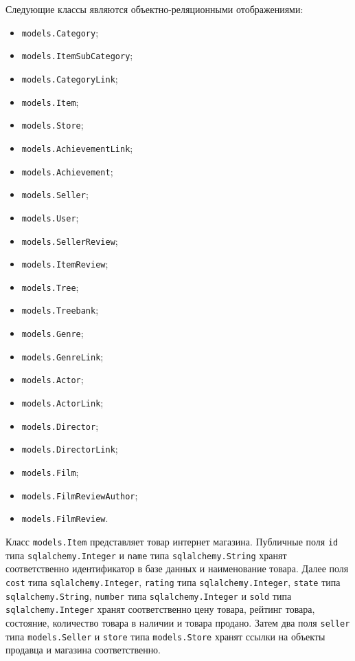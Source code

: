 Следующие классы являются объектно-реляционными отображениями:
\begin{itemize}
\item \texttt{models.Category};
\item \texttt{models.ItemSubCategory};
\item \texttt{models.CategoryLink};
\item \texttt{models.Item};
\item \texttt{models.Store};
\item \texttt{models.AchievementLink};
\item \texttt{models.Achievement};
\item \texttt{models.Seller};
\item \texttt{models.User};
\item \texttt{models.SellerReview};
\item \texttt{models.ItemReview};
\item \texttt{models.Tree};
\item \texttt{models.Treebank};
\item \texttt{models.Genre};
\item \texttt{models.GenreLink};
\item \texttt{models.Actor};
\item \texttt{models.ActorLink};
\item \texttt{models.Director};
\item \texttt{models.DirectorLink};
\item \texttt{models.Film};
\item \texttt{models.FilmReviewAuthor};
\item \texttt{models.FilmReview}.
\end{itemize}

Класс \texttt{models.Item} представляет товар интернет магазина. Публичные поля \texttt{id} типа \texttt{sqlalchemy.Integer} и \texttt{name} типа \texttt{sqlalchemy.String} хранят соответственно идентификатор в базе данных и наименование товара. Далее поля \texttt{cost} типа \texttt{sqlalchemy.Integer}, \texttt{rating} типа \texttt{sqlalchemy.Integer}, \texttt{state} типа \texttt{sqlalchemy.String}, \texttt{number} типа \texttt{sqlalchemy.Integer} и \texttt{sold} типа \texttt{sqlalchemy.Integer} хранят соответственно цену товара, рейтинг товара, состояние, количество товара в наличии и товара продано. Затем два поля \texttt{seller} типа \texttt{models.Seller} и \texttt{store} типа \texttt{models.Store} хранят ссылки на объекты продавца и магазина соответственно.

